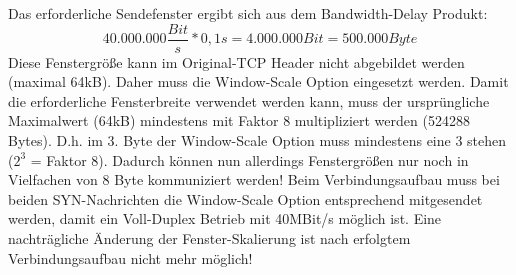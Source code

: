 Das erforderliche Sendefenster ergibt sich aus dem Bandwidth-Delay Produkt:
\[40.000.000 \frac{Bit}{s} * 0,1s = 4.000.000 Bit = 500.000 Byte\]
Diese Fenstergröße kann im Original-TCP Header nicht abgebildet werden (maximal 64kB). Daher muss die Window-Scale Option eingesetzt werden. Damit die erforderliche Fensterbreite verwendet werden kann, muss der ursprüngliche Maximalwert (64kB) mindestens mit Faktor 8 multipliziert werden (524288 Bytes). D.h. im 3. Byte der Window-Scale Option muss mindestens eine 3 stehen ($2^3$ = Faktor 8). Dadurch können nun allerdings Fenstergrößen nur noch in Vielfachen
von 8 Byte kommuniziert werden!
Beim Verbindungsaufbau muss bei beiden SYN-Nachrichten die Window-Scale Option entsprechend mitgesendet werden, damit ein Voll-Duplex Betrieb mit 40MBit/s möglich ist. Eine nachträgliche Änderung der Fenster-Skalierung ist nach erfolgtem Verbindungsaufbau nicht mehr möglich!